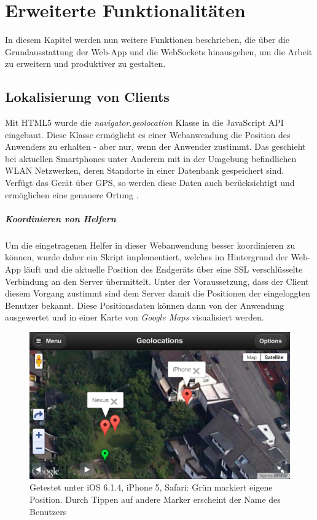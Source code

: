 \chapter{Erweiterte Funktionalitäten}
In diesem Kapitel werden nun weitere Funktionen beschrieben, die über die Grundausstattung der Web-App und die WebSockets hinausgehen, um die Arbeit zu erweitern und produktiver zu gestalten. 


\section{Lokalisierung von Clients}
Mit HTML5 wurde die \emph{navigator.geolocation} Klasse in die JavaScript API eingebaut. Diese Klasse ermöglicht es einer Webanwendung die Position des Anwenders zu erhalten - aber nur, wenn der Anwender zustimmt. Das geschieht bei aktuellen Smartphones unter Anderem mit in der Umgebung befindlichen WLAN Netzwerken, deren Standorte in einer Datenbank gespeichert sind. Verfügt das Gerät über GPS, so werden diese Daten auch berücksichtigt und ermöglichen eine genauere Ortung \cite[1. Absatz]{html5:geolocations}.

\paragraph{Koordinieren von Helfern}
Um die eingetragenen Helfer in dieser Webanwendung besser koordinieren zu können, wurde daher ein Skript implementiert, welches im Hintergrund der Web-App läuft und die aktuelle Position des Endgeräts über eine SSL verschlüsselte Verbindung an den Server übermittelt. Unter der Voraussetzung, dass der Client diesem Vorgang zustimmt sind dem Server damit die Positionen der eingeloggten Benutzer bekannt. Diese Positionsdaten können dann von der Anwendung ausgewertet und in einer Karte von \emph{Google Maps} \cite{google:maps} visualisiert werden.

\begin{figure}[!ht]
	\centering
	\includegraphics[width=15cm]{fig/screenshot_geolocations}
	\caption[Beispielansicht der Geolocations]{Getestet unter iOS 6.1.4, iPhone 5, Safari: Grün markiert eigene Position. Durch Tippen auf andere Marker erscheint der Name des Benutzers}
\end{figure}

